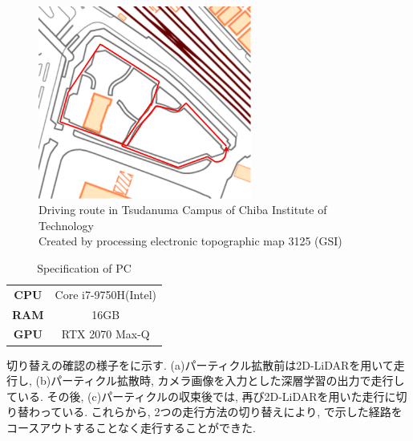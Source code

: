 \documentclass[uplatex, twocolumn, 9pt]{jsproceedings}
\begin{document}
\begin{figure}[h]
  \centering
  \includegraphics[width=70mm]{fig/tsudanuma-seg.pdf}
  \caption{Driving route in Tsudanuma Campus of Chiba Institute of Technology\\Created by processing electronic topographic map 3125 (GSI)}
  \label{fig:tsudanuma}%
\end{figure}

\begin{table}[h]
  \centering
  \caption{Specification of PC}
  \label{table:pc}
  \begin{tabular}{cc}
  \toprule%
  \textbf{CPU} & Core i7-9750H(Intel)\\
  \textbf{RAM} & 16GB\\
  \textbf{GPU} & RTX 2070 Max-Q\\
  \bottomrule%
  \end{tabular}
\end{table}

\newpage
切り替えの確認の様子をに示す. (a)パーティクル拡散前は2D-LiDARを用いて走行し, (b)パーティクル拡散時, カメラ画像を入力とした深層学習の出力で走行している. その後, (c)パーティクルの収束後では, 再び2D-LiDARを用いた走行に切り替わっている. これらから, 2つの走行方法の切り替えにより, で示した経路をコースアウトすることなく走行することができた. 
\end{document}
